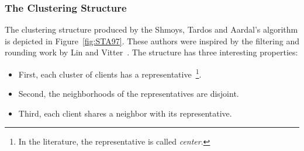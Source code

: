 \documentclass[oneside,final]{ucr}
\def\ssp{\def\baselinestretch{1.0}\large\normalsize}
\begin{document}
\subsubsection{The Clustering Structure}
The clustering structure produced by the Shmoys, Tardos and
Aardal's algorithm is depicted in Figure~\ref{fig:STA97}.
These authors were inspired by the filtering and rounding
work by Lin and Vitter~\cite{LinV92}. The structure has
three interesting properties:
\begin{itemize}
\item First, each cluster of clients has a
  representative~\footnote{In the literature, the
    representative is called \emph{center}.}.
\item Second, the neighborhoods of the representatives are
  disjoint.
\item Third, each client shares a neighbor with its
  representative.
\end{itemize}
%
%
\ssp
\end{document}
